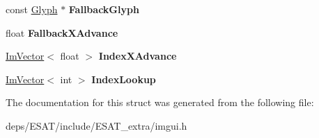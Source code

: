 \begin{DoxyCompactItemize}
\mbox{\label{struct_im_font_a05bd8c0b3f7c815d419bf8e15f67ea5c}} 
const \mbox{\hyperlink{struct_im_font_1_1_glyph}{Glyph}} $\ast$ {\bfseries Fallback\+Glyph}
\item 
\mbox{\label{struct_im_font_a882786c01a146b8ece8fa47c72bc6219}} 
float {\bfseries Fallback\+X\+Advance}
\item 
\mbox{\label{struct_im_font_a4baad09b18ee11199cac0b31dd40d80d}} 
\mbox{\hyperlink{class_im_vector}{Im\+Vector}}$<$ float $>$ {\bfseries Index\+X\+Advance}
\item 
\mbox{\label{struct_im_font_a5a2119c834cc4d81defd9f9c830de570}} 
\mbox{\hyperlink{class_im_vector}{Im\+Vector}}$<$ int $>$ {\bfseries Index\+Lookup}
\end{DoxyCompactItemize}


The documentation for this struct was generated from the following file\+:\begin{DoxyCompactItemize}
\item 
deps/\+E\+S\+A\+T/include/\+E\+S\+A\+T\+\_\+extra/imgui.\+h\end{DoxyCompactItemize}
